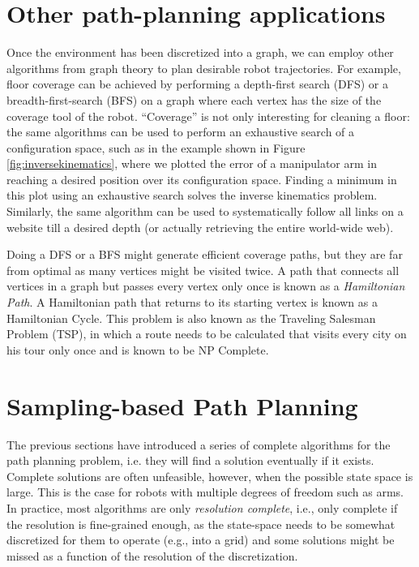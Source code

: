 
\section{Other path-planning applications}
Once the environment has been discretized into a graph, we can employ other algorithms from graph theory to plan desirable robot trajectories. For example, floor coverage can be achieved by performing a depth-first search (DFS) or a breadth-first-search (BFS) on a graph where each vertex has the size of the coverage tool of the robot. ``Coverage'' is not only interesting for cleaning a floor: the same algorithms can be used to perform an exhaustive search of a configuration space, such as in the example shown in Figure \ref{fig:inversekinematics}, where we plotted the error of a manipulator arm in reaching a desired position over its configuration space. Finding a minimum in this plot using an exhaustive search solves the inverse kinematics problem. Similarly, the same algorithm can be used to systematically follow all links on a website till a desired depth (or actually retrieving the entire world-wide web).

Doing a DFS or a BFS might generate efficient coverage paths, but they are far from optimal as many vertices might be visited twice. A path that connects all vertices in a graph but passes every vertex only once is known as a \emph{Hamiltonian Path}. A Hamiltonian path that returns to its starting vertex is known as a Hamiltonian Cycle. This problem is also known as the Traveling Salesman Problem (TSP), in which a route needs to be calculated that visits every city on his tour only once and is known to be NP Complete.

\section{Sampling-based Path Planning}
The previous sections have introduced a series of complete algorithms for the path planning problem, i.e. they will find a solution eventually if it exists. Complete solutions are often unfeasible, however, when the possible state space is large. This is the case for robots with multiple degrees of freedom such as arms. In practice, most algorithms are only \emph{resolution complete}, i.e., only complete if the resolution is fine-grained enough, as the state-space needs to be somewhat discretized for them to operate (e.g., into a grid) and some solutions might be missed as a function of the resolution of the discretization.

